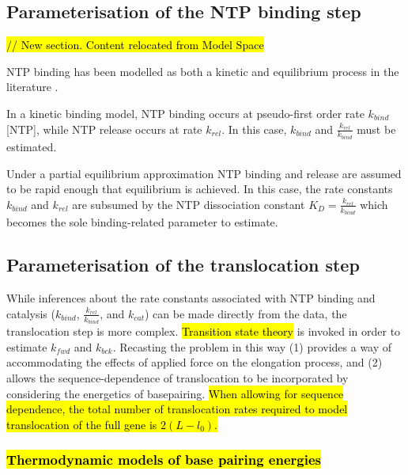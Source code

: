 \documentclass[10pt,letterpaper]{article}
\begin{document}
\subsection*{Parameterisation of the NTP binding step}

\hl{// New section. Content relocated from Model Space}



NTP binding has been modelled as both a kinetic and equilibrium process in the literature \cite{bai2004sequence, abbondanzieri2005direct, maoileidigh2011unified}.

In a kinetic binding model, NTP binding occurs at pseudo-first order rate $k_{bind}$[NTP], while NTP release occurs at rate $k_{rel}$. In this case, $k_{bind}$ and $\frac{k_{rel}}{k_{bind}}$ must be estimated.

Under a partial equilibrium approximation NTP binding and release are assumed to be rapid enough that equilibrium is achieved. In this case, the rate constants $k_{bind}$ and $k_{rel}$ are subsumed by the NTP dissociation constant $K_D = \frac{k_{rel}}{k_{bind}}$ which becomes the sole binding-related parameter to estimate.



\subsection*{Parameterisation of the translocation step}





While inferences about the rate constants associated with NTP binding and catalysis ($k_{bind}$, $\frac{k_{rel}}{k_{bind}}$, and $k_{cat}$) can be made directly from the data, the translocation step is more complex. \hl{Transition state theory} is invoked in order to estimate $k_{fwd}$ and $k_{bck}$. Recasting the problem in this way (1) provides a way of accommodating the effects of applied force on the elongation process, and (2) allows the sequence-dependence of translocation to be incorporated by considering the energetics of basepairing. \hl{When allowing for sequence dependence, the total number of translocation rates required to model translocation of the full gene is $2(L - l_0)$.}




\subsubsection*{\hl{Thermodynamic models of base pairing energies}}
\end{document}
